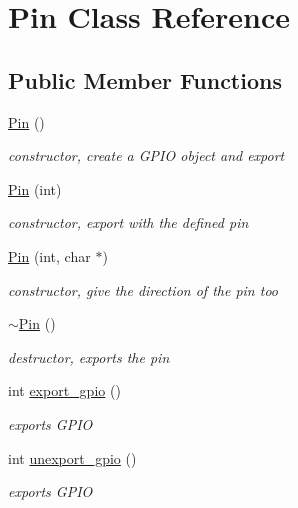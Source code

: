 \hypertarget{classPin}{}\section{Pin Class Reference}
\label{classPin}
\subsection*{Public Member Functions}
\begin{DoxyCompactItemize}
\item 
\mbox{\label{classPin_aaf3d92065cd9b9de91f01164bec418ea}} 
\mbox{\hyperlink{classPin_aaf3d92065cd9b9de91f01164bec418ea}{Pin}} ()
\begin{DoxyCompactList}\small\item\em constructor, create a G\+P\+IO object and export \end{DoxyCompactList}\item 
\mbox{\hyperlink{classPin_a580d21a6d49bf1276146b0fab1a6039e}{Pin}} (int)
\begin{DoxyCompactList}\small\item\em constructor, export with the defined pin \end{DoxyCompactList}\item 
\mbox{\hyperlink{classPin_ae09bd2322f5ebbfaf98a379566d88ac0}{Pin}} (int, char $\ast$)
\begin{DoxyCompactList}\small\item\em constructor, give the direction of the pin too \end{DoxyCompactList}\item 
\mbox{\label{classPin_a462c14c45d3d653731dde638aa6e7bb7}} 
\mbox{\hyperlink{classPin_a462c14c45d3d653731dde638aa6e7bb7}{$\sim$\+Pin}} ()
\begin{DoxyCompactList}\small\item\em destructor, exports the pin \end{DoxyCompactList}\item 
int \mbox{\hyperlink{classPin_a233ab381d3ebab706ca96bc3b78f0927}{export\+\_\+gpio}} ()
\begin{DoxyCompactList}\small\item\em exports G\+P\+IO \end{DoxyCompactList}\item 
int \mbox{\hyperlink{classPin_ac0010e89c86e30b5e453f223ec591e1f}{unexport\+\_\+gpio}} ()
\begin{DoxyCompactList}\small\item\em exports G\+P\+IO \end{DoxyCompactList}\item 

\end{DoxyCompactItemize}
